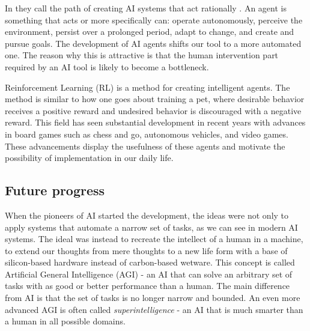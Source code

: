 \documentclass[12pt,A4]{report}
\theoremstyle{definition}
\begin{document}
In \autocite{Russel Norvig} they call the path of creating AI systems that act rationally . An agent is something that acts or more specifically can: operate autonomously, perceive the environment, persist over a prolonged period, adapt to change, and create and pursue goals. The development of AI agents shifts our tool to a more automated one. The reason why this is attractive is that the human intervention part required by an AI tool is likely to become a bottleneck\autocite{T'nkande Maskiner}. 

Reinforcement Learning (RL) is a method for creating intelligent agents. The method is similar to how one goes about training a pet, where desirable behavior receives a positive reward and undesired behavior is discouraged with a negative reward. This field has seen substantial development in recent years with advances in board games such as chess and go\autocite{Silver et al.}, autonomous vehicles\autocite{Levinson et al.}, and video games\autocite{Minh et al.}. These advancements display the usefulness of these agents and motivate the possibility of implementation in our daily life.


\subsection{Future progress}
When the pioneers of AI started the development, the ideas were not only to apply systems that automate a narrow set of tasks, as we can see in modern AI systems. The ideal was instead to recreate the intellect of a human in a machine\autocite{McCarthy et al.}, to extend our thoughts from mere thoughts to a new life form with a base of silicon-based hardware instead of carbon-based wetware. This concept is called Artificial General Intelligence (AGI) - an AI that can solve an arbitrary set of tasks with as good or better performance than a human. The main difference from AI is that the set of tasks is no longer narrow and bounded. An even more advanced AGI is often called \textit{superintelligence} \autocite{Superintelligence} - an AI that is much smarter than a human in all possible domains. 
\end{document}
